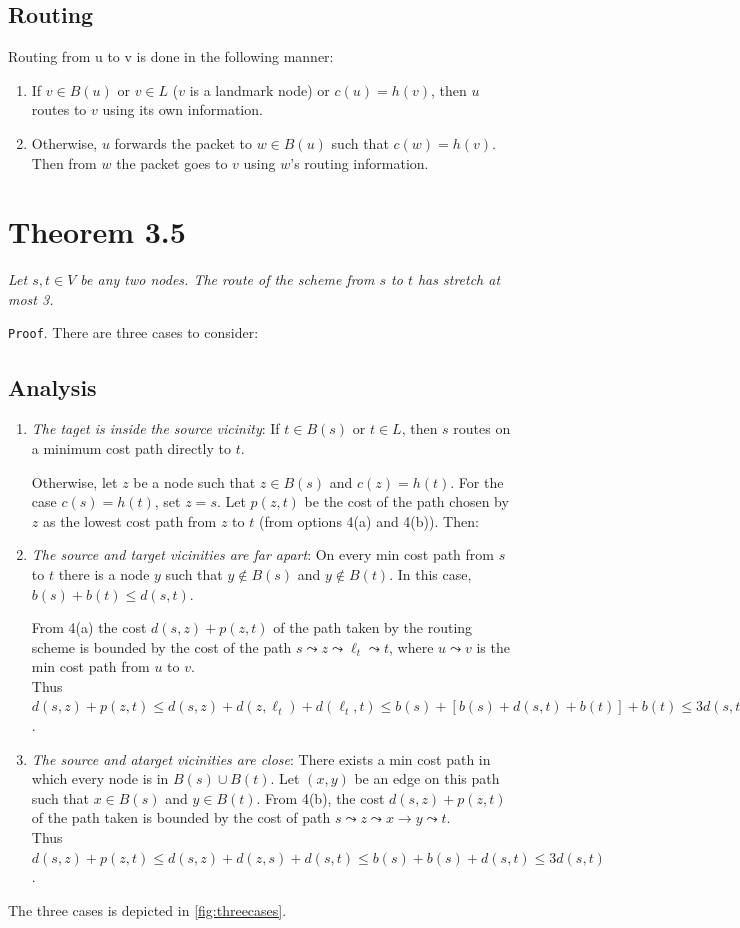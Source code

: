 \subsection{Routing}
Routing from u to v is done in the following manner:
\begin{enumerate}
    \item If $v \in B(u)$ or $v \in L$ ($v$ is a landmark node) or $c(u) =
        h(v)$, then $u$ routes to $v$ using its own information.
    \item Otherwise, $u$ forwards the packet to $w \in B(u)$ such that
        $c(w) = h(v)$. Then from $w$ the packet goes to $v$ using $w$’s
        routing information.
\end{enumerate}

\section{Theorem 3.5}
\textit{Let $s,t\in V$ be any two nodes. The route of the scheme from $s$ to $t$ has stretch at most 3.}

\texttt{Proof}. There are three cases to consider:
\subsection{Analysis}
\begin{enumerate}
    \item \textit{The taget is inside the source vicinity}: If $t\in B(s)$ or $t\in L$, then $s$ routes on a minimum cost path directly to $t$.

    Otherwise, let $z$ be a node such that $z\in B(s)$ and $c(z)=h(t)$. For the case $c(s)=h(t)$, set $z=s$. Let $p(z,t)$ be the cost of the path chosen by $z$ as the lowest cost   path from $z$ to $t$ (from options 4(a) and 4(b)). Then:
    \item \textit{The source and target vicinities are far apart}: On every min cost path from $s$ to $t$ there is a node $y$ such that $y\not\in B(s)$ and $y\not\in B(t)$. In this case, $b(s)+b(t)\leq d(s,t)$.

    From 4(a) the cost $d(s,z)+p(z, t)$ of the path taken by the routing scheme is bounded by the cost of the path $s\leadsto z\leadsto \ell_t\leadsto t$, where $u\leadsto v$ is the min cost path from $u$ to $v$.\\
    Thus $d(s,z)+p(z,t) \leq d(s,z)+d(z,\ell_t)+d(\ell_t,t) \leq b(s) + [b(s) + d(s,t) + b(t)] + b(t) \leq 3d(s,t)$.
    \item \textit{The source and atarget vicinities are close}: There exists a min cost path in which every node is in $B(s)\cup B(t)$. Let $(x,y)$ be an edge on this path such that $x\in B(s)$ and $y\in B(t)$. From 4(b), the cost $d(s,z)+p(z,t)$ of the path taken is bounded by the cost of path $s\leadsto z\leadsto x\rightarrow y \leadsto t$.\\
    Thus $d(s,z)+p(z,t) \leq d(s,z) + d(z,s) + d(s,t) \leq b(s)+b(s)+d(s,t)\leq 3d(s,t)$.
\end{enumerate}
The three cases is depicted in \autoref{fig:threecases}.

